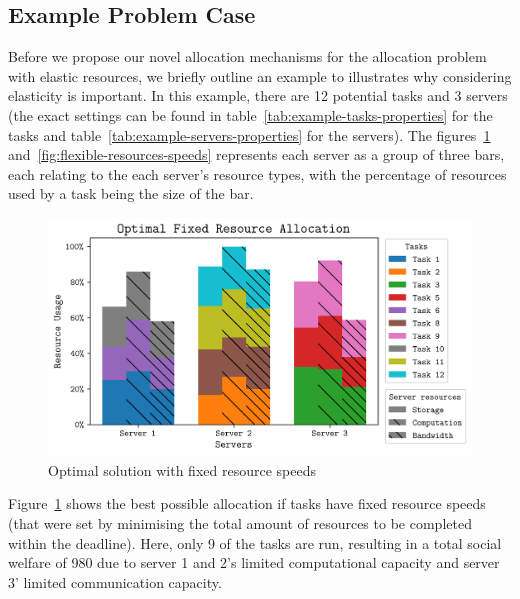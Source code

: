 \subsection{Example Problem Case}\label{subsec:example-problem-case}
Before we propose our novel allocation mechanisms for the allocation problem with elastic resources, we briefly
outline an example to illustrates why considering elasticity is important. In this example, there are 12 potential
tasks and 3 servers (the exact settings can be found in table~\ref{tab:example-tasks-properties} for the tasks and
table~\ref{tab:example-servers-properties} for the servers). The figures~\ref{fig:fixed-resources-speeds}
and~\ref{fig:flexible-resources-speeds} represents each server as a group of three bars, each relating to the each
server's resource types, with the percentage of resources used by a task being the size of the bar.

\begin{figure}[th]
    \centering
    \includegraphics[width=\linewidth]{figs/allocation/optimal_fixed_resource_allocation.png}
    \caption{Optimal solution with fixed resource speeds}
    \label{fig:fixed-resources-speeds}
\end{figure}

Figure~\ref{fig:fixed-resources-speeds} shows the best possible allocation if tasks have fixed resource speeds (that
were set by minimising the total amount of resources to be completed within the deadline). Here, only 9 of the tasks
are run, resulting in a total social welfare of 980 due to server 1 and 2's limited computational capacity and server
3' limited communication capacity.

